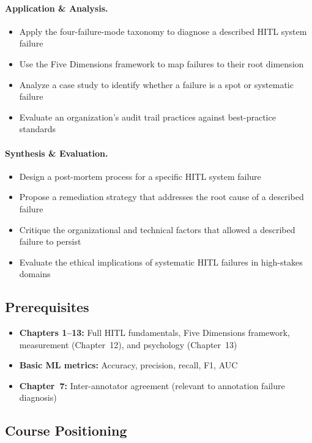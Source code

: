 \paragraph{Application \& Analysis.}
\begin{itemize}
    \item Apply the four-failure-mode taxonomy to diagnose a described HITL system failure
    \item Use the Five Dimensions framework to map failures to their root dimension
    \item Analyze a case study to identify whether a failure is a spot or systematic failure
    \item Evaluate an organization's audit trail practices against best-practice standards
\end{itemize}

\paragraph{Synthesis \& Evaluation.}
\begin{itemize}
    \item Design a post-mortem process for a specific HITL system failure
    \item Propose a remediation strategy that addresses the root cause of a described failure
    \item Critique the organizational and technical factors that allowed a described failure to persist
    \item Evaluate the ethical implications of systematic HITL failures in high-stakes domains
\end{itemize}

\subsection{Prerequisites}
\begin{itemize}
    \item \textbf{Chapters 1--13:} Full HITL fundamentals, Five Dimensions framework, measurement (Chapter~12), and psychology (Chapter~13)
    \item \textbf{Basic ML metrics:} Accuracy, precision, recall, F1, AUC
    \item \textbf{Chapter~7:} Inter-annotator agreement (relevant to annotation failure diagnosis)
\end{itemize}

\subsection{Course Positioning}

